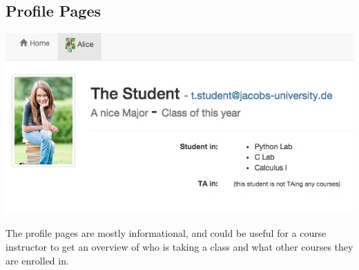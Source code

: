 \subsection{Profile Pages}

\includegraphics[width=\textwidth]{screenshots/StudentProfile.jpg}

The profile pages are mostly informational, and could be useful for a course instructor to get an overview of who is taking a class and what other courses they are enrolled in.
